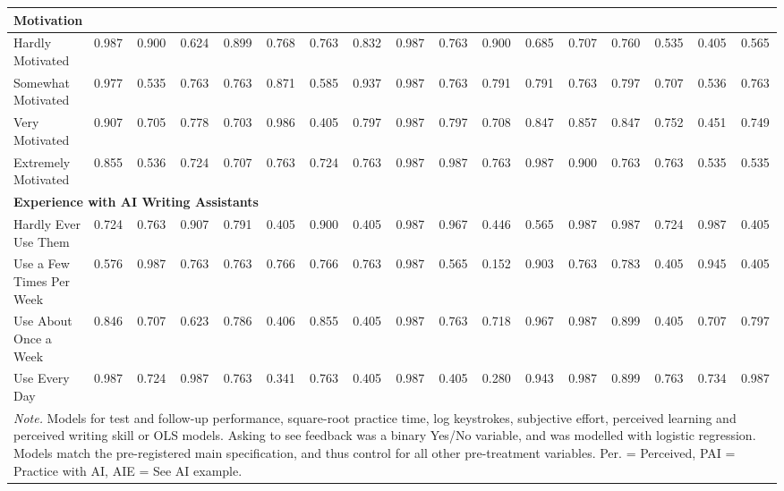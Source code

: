 \documentclass[11pt]{report}
\begin{document}
\begin{append}
\begin{landscape}
\begin{table}[h]
\begin{tabular}{@{\extracolsep{-4pt}}lcccccccccccccccc}
    \multicolumn{17}{l}{\textbf{Motivation}} \\ 
    \midrule
    Hardly Motivated & 0.987 & 0.900 & 0.624 & 0.899 & 0.768 & 0.763 & 0.832 & 0.987 & 0.763 & 0.900 & 0.685 & 0.707 & 0.760 & 0.535 & 0.405 & 0.565 \\ 
    Somewhat Motivated & 0.977 & 0.535 & 0.763 & 0.763 & 0.871 & 0.585 & 0.937 & 0.987 & 0.763 & 0.791 & 0.791 & 0.763 & 0.797 & 0.707 & 0.536 & 0.763 \\ 
    Very Motivated & 0.907 & 0.705 & 0.778 & 0.703 & 0.986 & 0.405 & 0.797 & 0.987 & 0.797 & 0.708 & 0.847 & 0.857 & 0.847 & 0.752 & 0.451 & 0.749 \\ 
    Extremely Motivated & 0.855 & 0.536 & 0.724 & 0.707 & 0.763 & 0.724 & 0.763 & 0.987 & 0.987 & 0.763 & 0.987 & 0.900 & 0.763 & 0.763 & 0.535 & 0.535 \\ 
    \midrule
    
    \multicolumn{17}{l}{\textbf{Experience with AI Writing Assistants}} \\ 
    \midrule
    Hardly Ever Use Them & 0.724 & 0.763 & 0.907 & 0.791 & 0.405 & 0.900 & 0.405 & 0.987 & 0.967 & 0.446 & 0.565 & 0.987 & 0.987 & 0.724 & 0.987 & 0.405 \\ 
    Use a Few Times Per Week & 0.576 & 0.987 & 0.763 & 0.763 & 0.766 & 0.766 & 0.763 & 0.987 & 0.565 & 0.152 & 0.903 & 0.763 & 0.783 & 0.405 & 0.945 & 0.405 \\ 
    Use About Once a Week & 0.846 & 0.707 & 0.623 & 0.786 & 0.406 & 0.855 & 0.405 & 0.987 & 0.763 & 0.718 & 0.967 & 0.987 & 0.899 & 0.405 & 0.707 & 0.797 \\ 
    Use Every Day & 0.987 & 0.724 & 0.987 & 0.763 & 0.341 & 0.763 & 0.405 & 0.987 & 0.405 & 0.280 & 0.943 & 0.987 & 0.899 & 0.763 & 0.734 & 0.987 \\ 
    \midrule
    \multicolumn{17}{p{\textwidth}}{\textit{Note.} Models for test and follow-up performance, square-root practice time, log keystrokes, subjective effort, perceived learning and perceived writing skill or OLS models. Asking to see feedback was a binary Yes/No variable, and was modelled with logistic regression. Models match the pre-registered main specification, and thus control for all other pre-treatment variables. Per. = Perceived, PAI = Practice with AI, AIE = See AI example.}
\vspace{5pt}
    \end{tabular}
\end{table}
\end{landscape}


\end{append}
\end{document}
